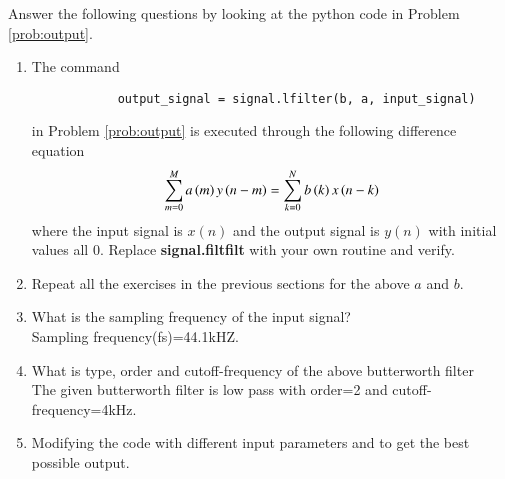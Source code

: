 \documentclass[journal,12pt,twocolumn]{IEEEtran}
\renewcommand\thesection{\arabic{section}}
\begin{document}
	Answer the following questions by looking at the python code in Problem \ref{prob:output}.
	\begin{enumerate}[label=\thesection.\arabic*]
		\item
		The command
		\begin{lstlisting}
			output_signal = signal.lfilter(b, a, input_signal)
		\end{lstlisting}
		in Problem \ref{prob:output} is executed through the following difference equation
		\begin{equation}
			\label{eq:iir_filter_gen}
			\sum _{m=0}^{M}a\left(m\right)y\left(n-m\right)=\sum _{k=0}^{N}b\left(k\right)x\left(n-k\right)
		\end{equation}
		where the input signal is $x(n)$ and the output signal is $y(n)$ with initial values all 0. Replace
		\textbf{signal.filtfilt} with your own routine and verify.
		\item Repeat all the exercises in the previous sections for the above $a$ and $b$.
		
		\item What is the sampling frequency of the input signal?
		\\
		\solution
		Sampling frequency(fs)=44.1kHZ.
		\item
		What is type, order and  cutoff-frequency of the above butterworth filter
		\\
		\solution
		The given butterworth filter is low pass with order=2 and cutoff-frequency=4kHz.
		\item
		Modifying the code with different input parameters and to get the best possible output.
	\end{enumerate}
	
\end{document}
